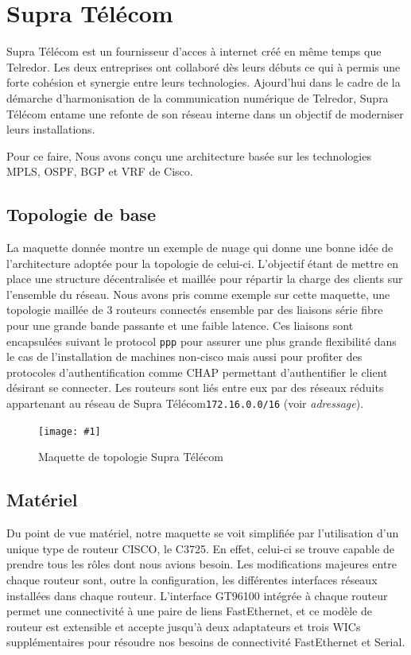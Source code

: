 \documentclass{article}
\newenvironment{figue}[1]{
	\par
	\bigskip
	\begin{figure}[h]
	\begin{center}
	  \texttt{[image: \#1]}
	\end{center}
}{
	\end{figure}
	\bigskip
}
\newcommand{\tlr}{Telredor\xspace}
\newcommand{\spr}{Supra Télécom\xspace}
\begin{document}
\clearpage

\section{\spr}

\spr est un fournisseur d'acces à internet créé en même temps que \tlr.
Les deux entreprises ont collaboré dès leurs débuts ce qui à permis une forte cohésion et synergie entre leurs technologies.
Ajourd'hui dans le cadre de la démarche d'harmonisation de la communication numérique de \tlr, \spr entame une refonte de son réseau interne dans un objectif de moderniser leurs installations.

Pour ce faire, Nous avons conçu une architecture basée sur les technologies MPLS, OSPF, BGP et VRF de Cisco.

\subsection{Topologie de base}

La maquette donnée montre un exemple de nuage qui donne une bonne idée de l'architecture adoptée pour la topologie de celui-ci.
L'objectif étant de mettre en place une structure décentralisée et maillée pour répartir la charge des clients sur l'ensemble du réseau.
Nous avons pris comme exemple sur cette maquette, une topologie maillée de 3 routeurs connectés ensemble par des liaisons série fibre pour une grande bande passante et une faible latence.
Ces liaisons sont encapsulées suivant le protocol \texttt{ppp} pour assurer une plus grande flexibilité dans le cas de l'installation de machines non-cisco mais aussi pour profiter des protocoles d'authentification comme CHAP permettant d'authentifier le client désirant se connecter.
Les routeurs sont liés entre eux par des réseaux réduits appartenant au réseau de \spr \texttt{172.16.0.0/16} (voir \emph{adressage}).

\begin{figue}{img/nuage-supra.pdf}
	\caption{Maquette de topologie \spr}
\end{figue}

\subsection{Matériel}

Du point de vue matériel, notre maquette se voit simplifiée par l'utilisation d'un unique type de routeur CISCO, le C3725.
En effet, celui-ci se trouve capable de prendre tous les rôles dont nous avions besoin.
Les modifications majeures entre chaque routeur sont, outre la configuration, les différentes interfaces réseaux installées dans chaque routeur.
L'interface GT96100 intégrée à chaque routeur permet une connectivité à une paire de liens FastEthernet, et ce modèle de routeur est extensible et accepte jusqu'à deux adaptateurs et trois WICs supplémentaires pour résoudre nos besoins de connectivité FastEthernet et Serial.
\end{document}
